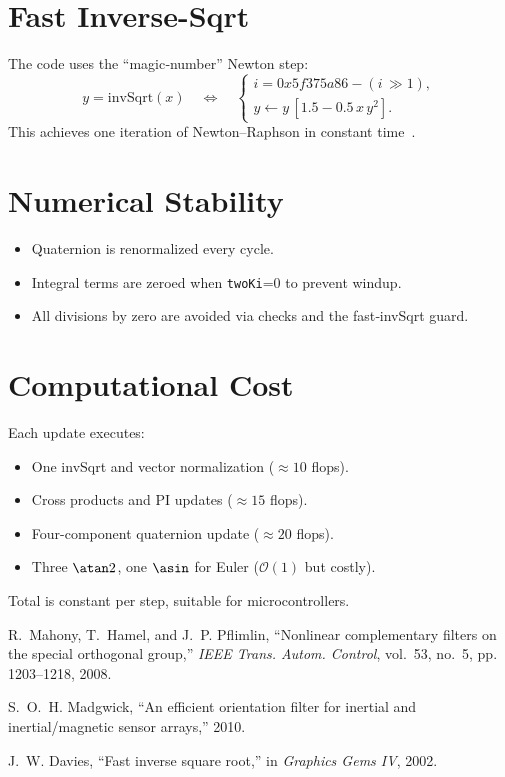 \documentclass[12pt]{article}
\begin{document}
\section{Fast Inverse-Sqrt}
The code uses the “magic‐number” Newton step:
\[
y = \mathrm{invSqrt}(x)
\quad\Longleftrightarrow\quad
\begin{cases}
i = 0x5f375a86 - (i\,\gg1),\\
y \leftarrow y\,[1.5 - 0.5\,x\,y^2].
\end{cases}
\]
This achieves one iteration of Newton–Raphson in constant time~\cite{Quake2002}.

\section{Numerical Stability}
\begin{itemize}
  \item Quaternion is renormalized every cycle.
  \item Integral terms are zeroed when \texttt{twoKi}=0 to prevent windup.
  \item All divisions by zero are avoided via checks and the fast‐invSqrt guard.
\end{itemize}

\section{Computational Cost}
Each update executes:
\begin{itemize}
  \item One invSqrt and vector normalization (\(\approx10\) flops).
  \item Cross products and PI updates (\(\approx15\) flops).
  \item Four-component quaternion update (\(\approx20\) flops).
  \item Three \(\atan2\), one \(\asin\) for Euler (\(\mathcal O(1)\) but costly).
\end{itemize}
Total is constant per step, suitable for microcontrollers.

\begin{thebibliography}{9}
R.~Mahony, T.~Hamel, and J.~P. Pflimlin, “Nonlinear complementary filters on the special orthogonal group,” \emph{IEEE Trans. Autom. Control}, vol.~53, no.~5, pp. 1203–1218, 2008.

S.~O.~H. Madgwick, “An efficient orientation filter for inertial and inertial/magnetic sensor arrays,” 2010.

J.~W. Davies, “Fast inverse square root,” in \emph{Graphics Gems IV}, 2002.

\end{thebibliography}
\end{document}
